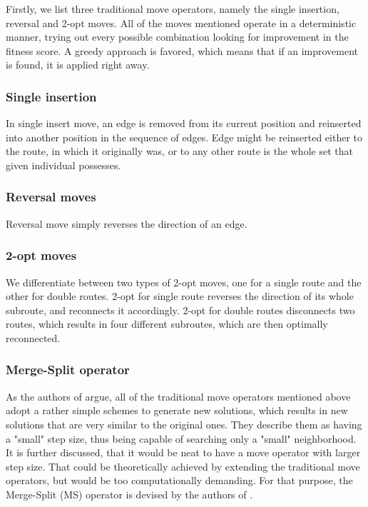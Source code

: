 \documentclass[twoside]{ctuthesis}
\theoremstyle{plain}
\theoremstyle{definition}
\theoremstyle{note}
\begin{document}
Firstly, we list three traditional move operators, namely the single insertion, reversal and 2-opt moves. All of the moves mentioned operate in a deterministic manner, trying out every possible combination looking for improvement in the fitness score. A greedy approach is favored, which means that if an improvement is found, it is applied right away.

\subsubsection{Single insertion}
In single insert move, an edge is removed from its current position and reinserted into another position in the sequence of edges. Edge might be reinserted either to the route, in which it originally was, or to any other route is the whole set that given individual possesses.

\subsubsection{Reversal moves}
Reversal move simply reverses the direction of an edge. 

\subsubsection{2-opt moves}
We differentiate between two types of 2-opt moves, one for a single route and the other for double routes.
2-opt for single route reverses the direction of its whole subroute, and reconnects it accordingly.
2-opt for double routes disconnects two routes, which results in four different subroutes, which are then optimally reconnected.


\subsubsection{Merge-Split operator}
As the authors of \cite{tang2009memetic} argue, all of the traditional move operators mentioned above adopt a rather simple schemes to generate new solutions, which results in new solutions that are very similar to the original ones. They describe them as having a "small" step size, thus being capable of searching only a "small" neighborhood.
It is further discussed, that it would be neat to have a move operator with larger step size. That could be theoretically achieved by extending the traditional move operators, but would be too computationally demanding. For that purpose, the Merge-Split (MS) operator is devised by the authors of \cite{tang2009memetic}.
\end{document}

